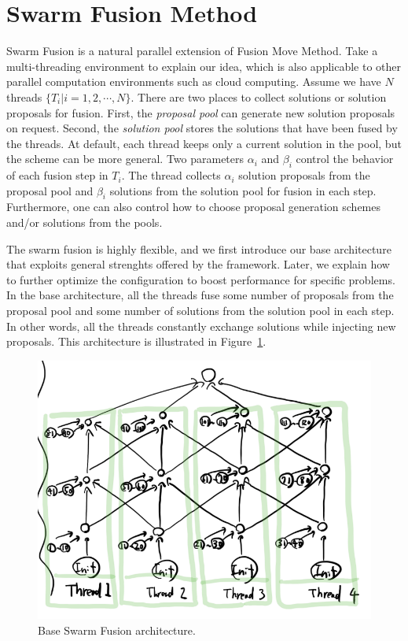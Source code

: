 \section{Swarm Fusion Method}
  Swarm Fusion is a natural
parallel extension of Fusion Move Method. Take a multi-threading
environment to explain our idea, which is also applicable to other
parallel computation environments such as cloud computing. Assume we
have $N$ threads $\{T_i | i=1, 2, \cdots, N\}$. There are two places to
collect solutions or solution proposals for fusion. First, the {\it
proposal pool} can generate new solution proposals on request.
%
Second, the {\it solution pool} stores the solutions that have been
fused by the threads. At default, each thread keeps only a current
solution in the pool, but the scheme can be more general. Two
parameters $\alpha_i$ and $\beta_i$ control the behavior of each fusion
step in $T_i$. The thread collects $\alpha_i$ solution proposals
from the proposal pool and $\beta_i$ solutions from the solution pool
for fusion in each step.
%
Furthermore, one can also control how to choose proposal generation
schemes and/or solutions from the pools.

The swarm fusion is highly flexible, and we first introduce our base
architecture that exploits general strenghts offered by the
framework. Later, we explain how to further optimize the configuration
to boost performance for specific problems. In the base architecture,
all the threads fuse some number of proposals from the proposal pool and
some number of solutions from the solution pool in each step. In other
words, all the threads constantly exchange solutions while injecting new
proposals. This architecture is illustrated in Figure~\ref{fig:base}.

\begin{figure}[tb]
 \includegraphics[width=\columnwidth]{figure/base_illustration.png}
 \caption{Base Swarm Fusion architecture.}\label{fig:base}
\end{figure}

